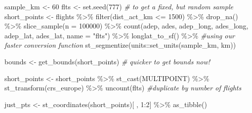 \documentclass[
]{book}
\newenvironment{Shaded}{\begin{snugshade}}{\end{snugshade}}
\newcommand{\AttributeTok}[1]{\textcolor[rgb]{0.77,0.63,0.00}{#1}}
\newcommand{\CommentTok}[1]{\textcolor[rgb]{0.56,0.35,0.01}{\textit{#1}}}
\newcommand{\DecValTok}[1]{\textcolor[rgb]{0.00,0.00,0.81}{#1}}
\newcommand{\FunctionTok}[1]{\textcolor[rgb]{0.00,0.00,0.00}{#1}}
\newcommand{\NormalTok}[1]{#1}
\newcommand{\OtherTok}[1]{\textcolor[rgb]{0.56,0.35,0.01}{#1}}
\newcommand{\SpecialCharTok}[1]{\textcolor[rgb]{0.00,0.00,0.00}{#1}}
\newcommand{\StringTok}[1]{\textcolor[rgb]{0.31,0.60,0.02}{#1}}
\begin{document}
\begin{Shaded}
\begin{Highlighting}[]
\NormalTok{sample\_km }\OtherTok{\textless{}{-}} \DecValTok{60}
\NormalTok{flts }\OtherTok{\textless{}{-}} \FunctionTok{set.seed}\NormalTok{(}\DecValTok{777}\NormalTok{) }\CommentTok{\# to get a fixed, but random sample}
\NormalTok{short\_points }\OtherTok{\textless{}{-}}\NormalTok{ flights }\SpecialCharTok{\%\textgreater{}\%} 
  \FunctionTok{filter}\NormalTok{(dist\_act\_km }\SpecialCharTok{\textless{}=} \DecValTok{1500}\NormalTok{) }\SpecialCharTok{\%\textgreater{}\%} 
  \FunctionTok{drop\_na}\NormalTok{() }\SpecialCharTok{\%\textgreater{}\%} 
  \FunctionTok{slice\_sample}\NormalTok{(}\AttributeTok{n =} \DecValTok{100000}\NormalTok{) }\SpecialCharTok{\%\textgreater{}\%}  
  \FunctionTok{count}\NormalTok{(adep, ades, adep\_long, ades\_long, adep\_lat, ades\_lat,}
        \AttributeTok{name =} \StringTok{"flts"}\NormalTok{) }\SpecialCharTok{\%\textgreater{}\%} 
  \FunctionTok{longlat\_to\_sf}\NormalTok{() }\SpecialCharTok{\%\textgreater{}\%}  \CommentTok{\#using our faster conversion function}
  \FunctionTok{st\_segmentize}\NormalTok{(units}\SpecialCharTok{::}\FunctionTok{set\_units}\NormalTok{(sample\_km, km)) }

\NormalTok{bounds }\OtherTok{\textless{}{-}} \FunctionTok{get\_bounds}\NormalTok{(short\_points) }\CommentTok{\# quicker to get bounds now!}

\NormalTok{short\_points }\OtherTok{\textless{}{-}}\NormalTok{ short\_points }\SpecialCharTok{\%\textgreater{}\%} 
  \FunctionTok{st\_cast}\NormalTok{(}\StringTok{\textquotesingle{}MULTIPOINT\textquotesingle{}}\NormalTok{) }\SpecialCharTok{\%\textgreater{}\%} 
  \FunctionTok{st\_transform}\NormalTok{(crs\_europe) }\SpecialCharTok{\%\textgreater{}\%} 
  \FunctionTok{uncount}\NormalTok{(flts) }\CommentTok{\#duplicate by number of flights}

\NormalTok{just\_pts }\OtherTok{\textless{}{-}} \FunctionTok{st\_coordinates}\NormalTok{(short\_points)[ , }\DecValTok{1}\SpecialCharTok{:}\DecValTok{2}\NormalTok{] }\SpecialCharTok{\%\textgreater{}\%} 
  \FunctionTok{as\_tibble}\NormalTok{()  }


\end{Highlighting}
\end{Shaded}
\end{document}
